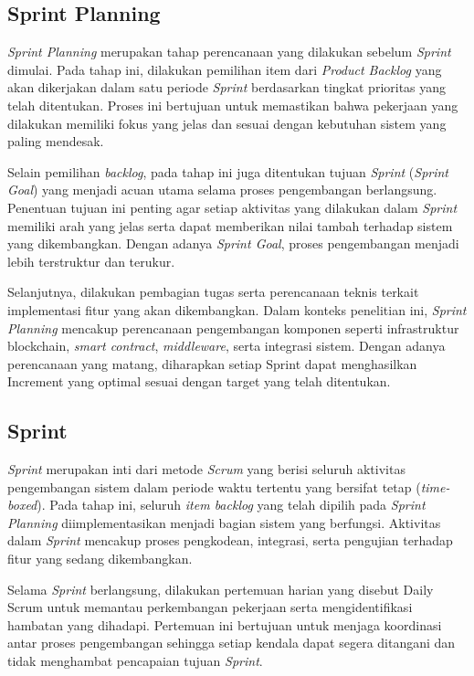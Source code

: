 		\subsection{Sprint Planning}
		\textit{Sprint Planning} merupakan tahap perencanaan yang dilakukan sebelum \textit{Sprint} dimulai. Pada tahap ini, dilakukan pemilihan item dari \textit{Product Backlog} yang akan dikerjakan dalam satu periode \textit{Sprint} berdasarkan tingkat prioritas yang telah ditentukan. Proses ini bertujuan untuk memastikan bahwa pekerjaan yang dilakukan memiliki fokus yang jelas dan sesuai dengan kebutuhan sistem yang paling mendesak.

		Selain pemilihan \textit{backlog}, pada tahap ini juga ditentukan tujuan \textit{Sprint} (\textit{Sprint Goal}) yang menjadi acuan utama selama proses pengembangan berlangsung. Penentuan tujuan ini penting agar setiap aktivitas yang dilakukan dalam \textit{Sprint} memiliki arah yang jelas serta dapat memberikan nilai tambah terhadap sistem yang dikembangkan. Dengan adanya \textit{Sprint Goal}, proses pengembangan menjadi lebih terstruktur dan terukur.

		Selanjutnya, dilakukan pembagian tugas serta perencanaan teknis terkait implementasi fitur yang akan dikembangkan. Dalam konteks penelitian ini, \textit{Sprint Planning} mencakup perencanaan pengembangan komponen seperti infrastruktur blockchain, \textit{smart contract}, \textit{middleware}, serta integrasi sistem. Dengan adanya perencanaan yang matang, diharapkan setiap Sprint dapat menghasilkan Increment yang optimal sesuai dengan target yang telah ditentukan.

		\subsection{Sprint}
		\textit{Sprint} merupakan inti dari metode \textit{Scrum} yang berisi seluruh aktivitas pengembangan sistem dalam periode waktu tertentu yang bersifat tetap (\textit{time-boxed}). Pada tahap ini, seluruh \textit{item backlog} yang telah dipilih pada \textit{Sprint Planning} diimplementasikan menjadi bagian sistem yang berfungsi. Aktivitas dalam \textit{Sprint} mencakup proses pengkodean, integrasi, serta pengujian terhadap fitur yang sedang dikembangkan.

		Selama \textit{Sprint} berlangsung, dilakukan pertemuan harian yang disebut Daily Scrum untuk memantau perkembangan pekerjaan serta mengidentifikasi hambatan yang dihadapi. Pertemuan ini bertujuan untuk menjaga koordinasi antar proses pengembangan sehingga setiap kendala dapat segera ditangani dan tidak menghambat pencapaian tujuan \textit{Sprint}.

